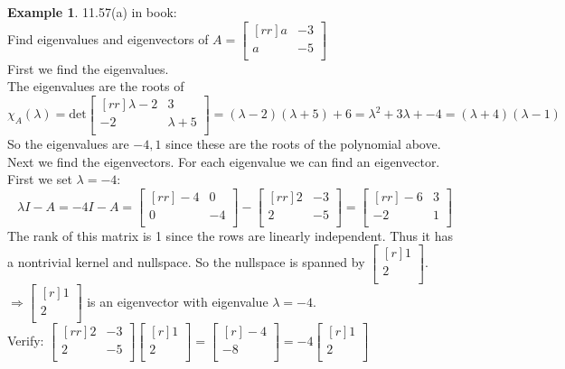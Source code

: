 \documentclass{report}
\theoremstyle{plain}
\theoremstyle{definition}
\newtheorem*{ex}{Example}
\theoremstyle{plain}
\begin{document}
\begin{ex}
11.57(a) in book:\\
Find eigenvalues and eigenvectors of $A=\begin{bmatrix}[rr]a&-3\\a&-5\\\end{bmatrix}$\\
First we find the eigenvalues.\\
The eigenvalues are the roots of
\[ \chi_A(\lambda)=\mathrm{det}\begin{bmatrix}[rr]\lambda - 2&3\\-2&\lambda + 5\\\end{bmatrix} = (\lambda - 2)(\lambda + 5) + 6 = \lambda^2+3\lambda + -4 = (\lambda + 4)(\lambda - 1) \]
So the eigenvalues are $-4,1$ since these are the roots of the polynomial above.\\
Next we find the eigenvectors. For each eigenvalue we can find an eigenvector.\\
First we set $\lambda = -4$:
\[ \lambda I-A = -4I-A = \begin{bmatrix}[rr]-4&0\\0&-4\\\end{bmatrix} - \begin{bmatrix}[rr]2&-3\\2&-5\\\end{bmatrix}=\begin{bmatrix}[rr]-6&3\\-2&1\\\end{bmatrix} \]
The rank of this matrix is 1 since the rows are linearly independent. Thus it has a nontrivial kernel and nullspace. So the nullspace is spanned by $\begin{bmatrix}[r]1\\2\\\end{bmatrix}$.\\
$\Rightarrow \begin{bmatrix}[r]1\\2\\\end{bmatrix}$ is an eigenvector with eigenvalue $\lambda=-4$.\\
Verify: $\begin{bmatrix}[rr]2&-3\\2&-5\\\end{bmatrix}\begin{bmatrix}[r]1\\2\\\end{bmatrix} = \begin{bmatrix}[r]-4\\-8\\\end{bmatrix} = -4\begin{bmatrix}[r]1\\2\\\end{bmatrix}$\\

\end{ex}
\end{document}
